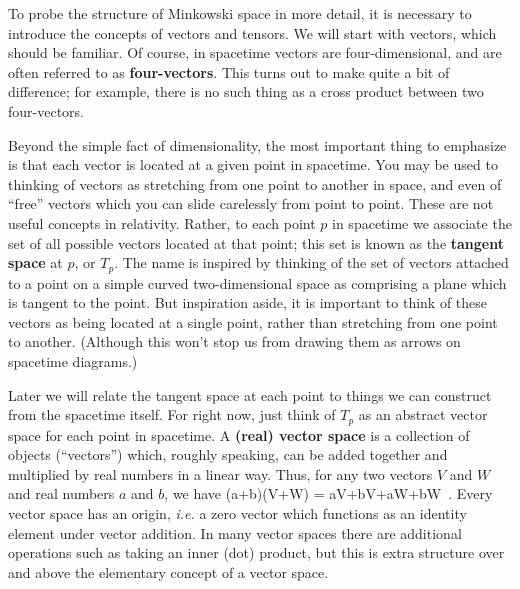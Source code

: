 To probe the structure of Minkowski space in more detail, it is 
necessary to introduce the concepts of vectors and tensors.  We will
start with vectors, which should be familiar.  Of course, in
spacetime vectors are four-dimensional, and are often referred to
as {\bf four-vectors}.  This turns out to make quite a bit of difference;
for example, there is no such thing as a cross product between two
four-vectors.

Beyond the simple fact of dimensionality, the most important thing to
emphasize is that each vector is located at a given point in spacetime.
You may be used to thinking of vectors as stretching from one point
to another in space, and even of ``free'' vectors which you can slide 
carelessly from point to point.  These are not useful concepts in
relativity.  Rather, to each point $p$ in spacetime we associate the
set of all possible vectors located at that point; this set is known
as the {\bf tangent space} at $p$, or $T_p$.  The name is inspired by
thinking of the set of vectors attached to a point on a simple curved
two-dimensional space as comprising a plane which is tangent to the
point.  But inspiration aside, it is important to think of these vectors
as being located at a single point, rather than stretching from one point
to another.  (Although this won't stop us from drawing them as arrows
on spacetime diagrams.)

\begin{figure}[h]
  \centerline{
  }
\end{figure}

Later we will relate the tangent space at each point to things we can
construct from the spacetime itself.  For right now, just think of $T_p$
as an abstract vector space for each point in spacetime.  A {\bf (real) vector 
space} is a collection of objects (``vectors'') which, roughly speaking, can 
be added together and multiplied by real numbers in a linear way.  Thus,
for any two vectors $V$ and $W$ and real numbers $a$ and $b$, we have
\be
  (a+b)(V+W) = aV+bV+aW+bW\ .\label{1.22}
\ee
Every vector space has an origin, {\it i.e.} a zero vector which functions
as an identity element under vector addition.  In many vector spaces there
are additional operations such as taking an inner (dot) product, but this
is extra structure over and above the elementary concept of a vector space.

